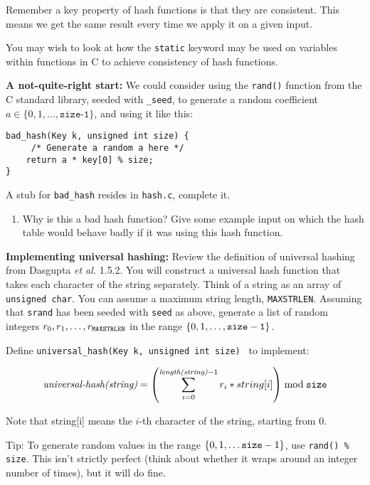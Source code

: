 \documentclass[11pt]{article}
\newcommand{\size}{{\tt size}}
\begin{document}
Remember a key property of hash functions is that they are consistent.
This means we get the same result every time we apply it on a given input.

You may wish to look at how the {\tt static} keyword may be used on variables
within functions in C to achieve consistency of hash functions.

\begin{description}
    \item {\bf A not-quite-right start:}
        We could consider using the {\tt rand()} function from the C standard library,
        seeded with {\tt \_seed},
        to generate a random coefficient $a \in \{0, 1, \ldots,
        \texttt{size-1}\}$,
        and using it like this:

\begin{verbatim}
bad_hash(Key k, unsigned int size) {
     /* Generate a random a here */
    return a * key[0] % size;
}
\end{verbatim}

        A stub for {\tt bad\_hash} resides in {\tt hash.c}, complete it.

\end{description}

\begin{enumerate}[resume]
    \item Why is this a bad hash function?
        Give some example input on which the hash table would behave badly if it was using this hash function.
\end{enumerate}

\begin{description}
    \item {\bf Implementing universal hashing: }
        Review the definition of universal hashing from Dasgupta {\it et al.} \/1.5.2.
        You will construct a universal hash function that takes each character of the string separately.
        Think of a string as an array of \texttt{unsigned char}.
        You can assume a maximum string length, {\tt MAXSTRLEN}.
        Assuming that {\tt srand} has been seeded with {\tt seed} as above,
        generate a list of random integers $r_0, r_1, \ldots, r_{{\tt MAXSTRLEN}}$
        in the range $\{0,1,\ldots,{\tt size-1}\}$.

        Define {\tt universal\_hash(Key k, unsigned int size) } to implement:

        $$\textit{universal-hash(string)} = \left( \sum_{i=0}^{ \textit{length(string)}-1} r_i * string[i] \right) \bmod \size $$

        Note that string[i] means the $i$-th character of the string,
        starting from 0.

        Tip: To generate random values in the range $\{0,1, \ldots {\tt size}-1 \}$,
        use {\tt rand() \%  size}.
        This isn't strictly perfect (think about whether it wraps around an integer number of times),
        but it will do fine.
\end{description}
\end{document}
